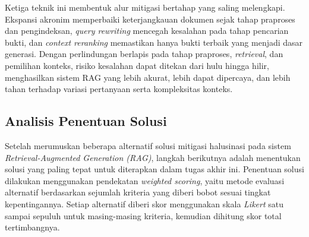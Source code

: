 Ketiga teknik ini membentuk alur mitigasi bertahap yang saling melengkapi. Ekspansi akronim memperbaiki keterjangkauan dokumen sejak tahap praproses dan pengindeksan, \textit{query rewriting} mencegah kesalahan pada tahap pencarian bukti, dan \textit{context reranking} memastikan hanya bukti terbaik yang menjadi dasar generasi. Dengan perlindungan berlapis pada tahap praproses, \textit{retrieval}, dan pemilihan konteks, risiko kesalahan dapat ditekan dari hulu hingga hilir, menghasilkan sistem RAG yang lebih akurat, lebih dapat dipercaya, dan lebih tahan terhadap variasi pertanyaan serta kompleksitas konteks.



\subsection{Analisis Penentuan Solusi}
\label{subsec:analisis-penentuan-solusi}

Setelah merumuskan beberapa alternatif solusi mitigasi halusinasi pada sistem \textit{Retrieval-Augmented Generation (RAG)}, langkah berikutnya adalah menentukan solusi yang paling tepat untuk diterapkan dalam tugas akhir ini. Penentuan solusi dilakukan menggunakan pendekatan \textit{weighted scoring}, yaitu metode evaluasi alternatif berdasarkan sejumlah kriteria yang diberi bobot sesuai tingkat kepentingannya. Setiap alternatif diberi skor menggunakan skala \textit{Likert} satu sampai sepuluh untuk masing-masing kriteria, kemudian dihitung skor total tertimbangnya.

